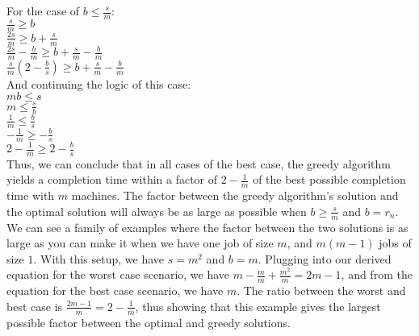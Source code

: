 \documentclass[11pt]{article}
\begin{document}
\begin{enumerate}
For the case of $b \leq \frac{s}{m}$: \\
$\frac{s}{m} \geq b$ \\
$\frac{2s}{m} \geq b + \frac{s}{m}$ \\
$\frac{2s}{m} - \frac{b}{m} \geq b + \frac{s}{m} - \frac{b}{m}$ \\
$\frac{s}{m}(2-\frac{b}{s}) \geq b + \frac{s}{m} - \frac{b}{m}$ \\
And continuing the logic of this case: \\
$mb \leq s$ \\
$m \leq \frac{s}{b}$ \\
$\frac{1}{m} \leq \frac{b}{s}$ \\
$-\frac{1}{m} \geq -\frac{b}{s}$ \\
$2-\frac{1}{m} \geq 2-\frac{b}{s}$ \\
Thus, we can conclude that in all cases of the best case, the greedy algorithm yields a completion time within a factor of $2-\frac{1}{m}$ of the best possible completion time with $m$ machines. The factor between the greedy algorithm's solution and the optimal solution will always be as large as possible when $b \geq \frac{s}{m}$ and $b = r_n$. We can see a family of examples where the factor between the two solutions is as large as you can make it when we have one job of size $m$, and $m(m-1)$ jobs of size $1$. With this setup, we have $s = m^2$ and $b = m$. Plugging into our derived equation for the worst case scenario, we have $m - \frac{m}{m} + \frac{m^2}{m} = 2m - 1$, and from the equation for the best case scenario, we have $m$. The ratio between the worst and best case is $\frac{2m-1}{m} = 2-\frac{1}{m}$, thus showing that this example gives the largest possible factor between the optimal and greedy solutions. 


\end{enumerate}
\end{document}
